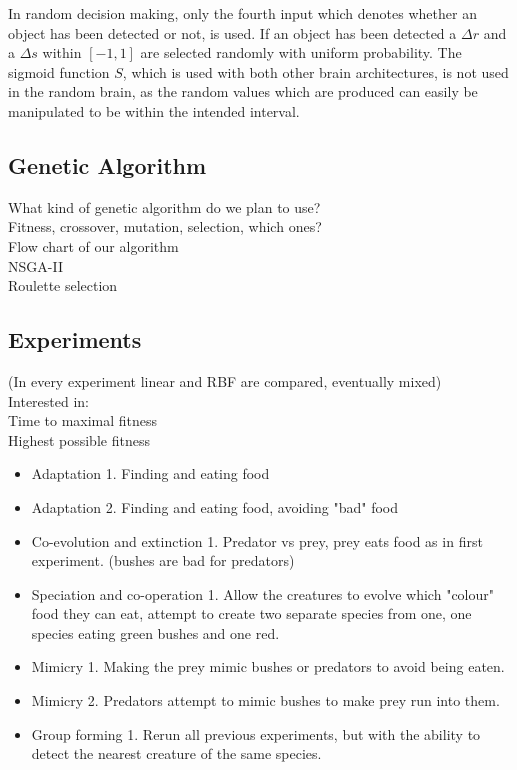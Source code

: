 \documentclass[a4paper,11pt]{kth-mag}
\begin{document}
In random decision making, only the fourth input which denotes whether an object has been detected or not, is used. If an object has been detected a $\Delta r$ and a $\Delta s$ within $[-1,1]$ are selected randomly with uniform probability. The sigmoid function $S$, which is used with both other brain architectures, is not used in the random brain, as the random values which are produced can easily be manipulated to be within the intended interval. 

\subsection{Genetic Algorithm}




What kind of genetic algorithm do we plan to use?\\
Fitness, crossover, mutation, selection, which ones?\\
Flow chart of our algorithm\\
NSGA-II\\
Roulette selection\\

\subsection{Experiments}
(In every experiment linear and RBF are compared, eventually mixed)\\
Interested in:\\
Time to maximal fitness\\
Highest possible fitness\\
\begin{itemize}
\item Adaptation 1. Finding and eating food
\item Adaptation 2. Finding and eating food, avoiding "bad" food
\item Co-evolution and extinction 1. Predator vs prey, prey eats food as in first experiment. (bushes are bad for predators)
\item Speciation and co-operation 1. Allow the creatures to evolve which "colour" food they can eat, attempt to create two separate species from one, one species eating green bushes and one red.
\item Mimicry 1. Making the prey mimic bushes or predators to avoid being eaten.
\item Mimicry 2. Predators attempt to mimic bushes to make prey run into them.
\item Group forming 1. Rerun all previous experiments, but with the ability to detect the nearest creature of the same species.
\end{itemize}
\end{document}
